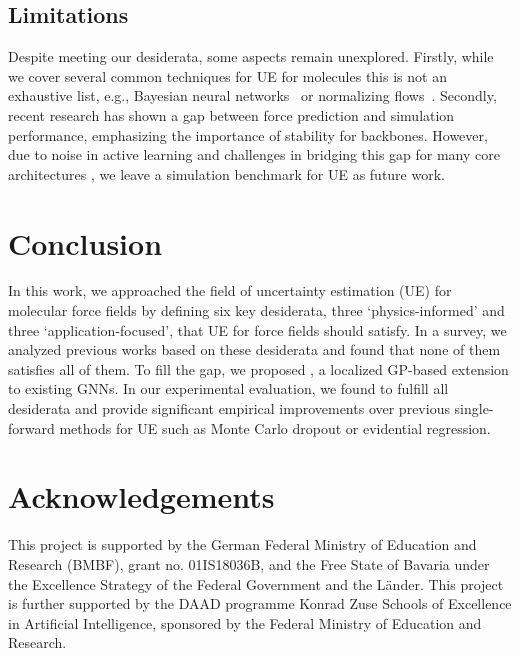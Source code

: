 \subsection*{Limitations}\label{sec:limitations}
Despite \oursacro{} meeting our desiderata, some aspects remain unexplored.
Firstly, while we cover several common techniques for UE for molecules this is not an exhaustive list, e.g., Bayesian neural networks~\citep{lambBayesianGraphNeural2020} or normalizing flows~\citep{kohlerSmoothNormalizingFlows2021}.
Secondly, recent research \cite{fu2022forces} has shown a gap between force prediction and simulation performance, emphasizing the importance of stability for backbones. However, due to noise in active learning \cite{mittal2019parting, ren2021survey} and challenges in bridging this gap for many core architectures \cite{fu2022forces}, we leave a simulation benchmark for UE as future work.

\section{Conclusion}\label{sec:conclusion}
In this work, we approached the field of uncertainty estimation (UE) for molecular force fields by defining six key desiderata, three `physics-informed' and three `application-focused', that UE for force fields should satisfy.
In a survey, we analyzed previous works based on these desiderata and found that none of them satisfies all of them.
To fill the gap, we proposed \oursacro{}, a localized GP-based extension to existing GNNs.
In our experimental evaluation, we found \oursacro{} to fulfill all desiderata and provide significant empirical improvements over previous single-forward methods for UE such as Monte Carlo dropout or evidential regression.


\section*{Acknowledgements}
This project is supported by the German Federal Ministry of Education and Research (BMBF), grant no. 01IS18036B, and the Free State of Bavaria under the Excellence Strategy of the Federal Government and the Länder. This project is further supported by the DAAD programme Konrad Zuse Schools of Excellence in Artificial Intelligence, sponsored by the Federal Ministry of Education and Research.
